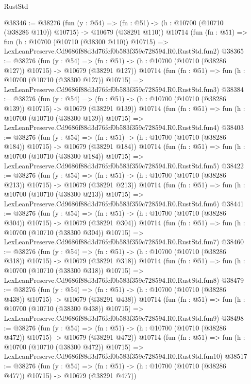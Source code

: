 \begin{lexlean}{RustStd}
\begin{coremodule}
@38346 := @38276
    (fun (y : @54) =>
    (fn : @51) -> (h : @10700 (@10710 (@38286 @110)) @10715) -> @10679 (@38291 @110))
    @10714
    (fun (fn : @51) =>
    fun (h : @10700 (@10710 (@38300 @110)) @10715) =>
    LexLeanPreserve.Cd9686f88d3d76fcf0b583f359c728594.R0.RustStd.fun2)
@38365 := @38276
    (fun (y : @54) =>
    (fn : @51) -> (h : @10700 (@10710 (@38286 @127)) @10715) -> @10679 (@38291 @127))
    @10714
    (fun (fn : @51) =>
    fun (h : @10700 (@10710 (@38300 @127)) @10715) =>
    LexLeanPreserve.Cd9686f88d3d76fcf0b583f359c728594.R0.RustStd.fun3)
@38384 := @38276
    (fun (y : @54) =>
    (fn : @51) -> (h : @10700 (@10710 (@38286 @139)) @10715) -> @10679 (@38291 @139))
    @10714
    (fun (fn : @51) =>
    fun (h : @10700 (@10710 (@38300 @139)) @10715) =>
    LexLeanPreserve.Cd9686f88d3d76fcf0b583f359c728594.R0.RustStd.fun4)
@38403 := @38276
    (fun (y : @54) =>
    (fn : @51) -> (h : @10700 (@10710 (@38286 @184)) @10715) -> @10679 (@38291 @184))
    @10714
    (fun (fn : @51) =>
    fun (h : @10700 (@10710 (@38300 @184)) @10715) =>
    LexLeanPreserve.Cd9686f88d3d76fcf0b583f359c728594.R0.RustStd.fun5)
@38422 := @38276
    (fun (y : @54) =>
    (fn : @51) -> (h : @10700 (@10710 (@38286 @213)) @10715) -> @10679 (@38291 @213))
    @10714
    (fun (fn : @51) =>
    fun (h : @10700 (@10710 (@38300 @213)) @10715) =>
    LexLeanPreserve.Cd9686f88d3d76fcf0b583f359c728594.R0.RustStd.fun6)
@38441 := @38276
    (fun (y : @54) =>
    (fn : @51) -> (h : @10700 (@10710 (@38286 @304)) @10715) -> @10679 (@38291 @304))
    @10714
    (fun (fn : @51) =>
    fun (h : @10700 (@10710 (@38300 @304)) @10715) =>
    LexLeanPreserve.Cd9686f88d3d76fcf0b583f359c728594.R0.RustStd.fun7)
@38460 := @38276
    (fun (y : @54) =>
    (fn : @51) -> (h : @10700 (@10710 (@38286 @318)) @10715) -> @10679 (@38291 @318))
    @10714
    (fun (fn : @51) =>
    fun (h : @10700 (@10710 (@38300 @318)) @10715) =>
    LexLeanPreserve.Cd9686f88d3d76fcf0b583f359c728594.R0.RustStd.fun8)
@38479 := @38276
    (fun (y : @54) =>
    (fn : @51) -> (h : @10700 (@10710 (@38286 @438)) @10715) -> @10679 (@38291 @438))
    @10714
    (fun (fn : @51) =>
    fun (h : @10700 (@10710 (@38300 @438)) @10715) =>
    LexLeanPreserve.Cd9686f88d3d76fcf0b583f359c728594.R0.RustStd.fun9)
@38498 := @38276
    (fun (y : @54) =>
    (fn : @51) -> (h : @10700 (@10710 (@38286 @472)) @10715) -> @10679 (@38291 @472))
    @10714
    (fun (fn : @51) =>
    fun (h : @10700 (@10710 (@38300 @472)) @10715) =>
    LexLeanPreserve.Cd9686f88d3d76fcf0b583f359c728594.R0.RustStd.fun10)
@38517 := @38276
    (fun (y : @54) =>
    (fn : @51) -> (h : @10700 (@10710 (@38286 @477)) @10715) -> @10679 (@38291 @477))

\end{coremodule}
\end{lexlean}
